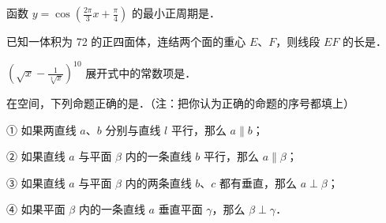 \begin{question}
函数 $y = \cos\left(\frac{2\pi}{3}x + \frac{\pi}{4}\right)$ 的最小正周期是\gkblank{}．

\end{question}
\begin{question}
已知一体积为 72 的正四面体，连结两个面的重心 $E$、$F$，则线段 $EF$ 的长是\gkblank{}．

\end{question}
\begin{question}
$\left(\sqrt{x} - \frac{1}{\sqrt[3]{x}}\right)^{10}$ 展开式中的常数项是\gkblank{}．

\end{question}
\begin{question}
在空间，下列命题正确的是\gkblank{}．（注：把你认为正确的命题的序号都填上）

① 如果两直线 $a$、$b$ 分别与直线 $l$ 平行，那么 $a \parallel b$；

② 如果直线 $a$ 与平面 $\beta$ 内的一条直线 $b$ 平行，那么 $a \parallel \beta$；

③ 如果直线 $a$ 与平面 $\beta$ 内的两条直线 $b$、$c$ 都有垂直，那么 $a \perp \beta$；

④ 如果平面 $\beta$ 内的一条直线 $a$ 垂直平面 $\gamma$，那么 $\beta \perp \gamma$．

\end{question}

